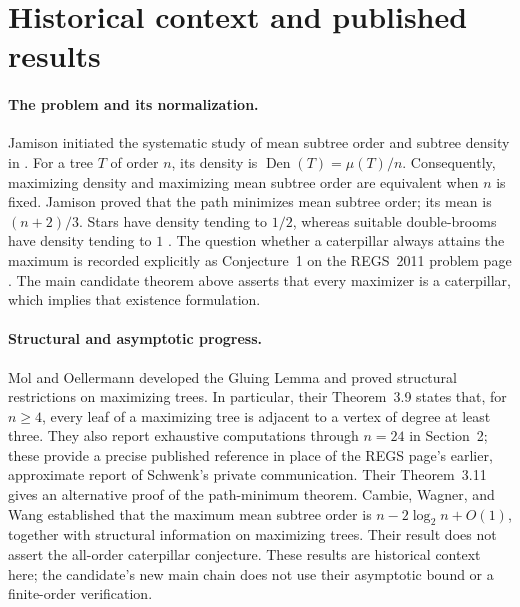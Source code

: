 \documentclass[11pt,letterpaper]{article}
\theoremstyle{plain}
\begin{document}
\clearpage
\tableofcontents
\clearpage

\section*{Historical context and published results}
\label{sec:historical-context}

\paragraph{The problem and its normalization.}
Jamison initiated the systematic study of mean subtree order and subtree density in
\cite{Jamison1983,Jamison1984}. For a tree $T$ of order $n$, its density is
$\operatorname{Den}(T)=\mu(T)/n$. Consequently, maximizing density and maximizing
mean subtree order are equivalent when $n$ is fixed. Jamison proved that the path
minimizes mean subtree order; its mean is $(n+2)/3$. Stars have density tending
to $1/2$, whereas suitable double-brooms have density tending to $1$
\cite{Jamison1983}. The question whether a caterpillar always attains the
maximum is recorded explicitly as Conjecture~1 on the REGS~2011 problem page
\cite{JamisonREGS2011}. The main candidate theorem above asserts that every
maximizer is a caterpillar, which implies that existence formulation.

\paragraph{Structural and asymptotic progress.}
Mol and Oellermann \cite{MolOellermann2019} developed the Gluing Lemma and proved
structural restrictions on maximizing trees. In particular, their Theorem~3.9
states that, for $n\ge4$, every leaf of a maximizing tree is adjacent to a vertex
of degree at least three. They also report exhaustive computations through
$n=24$ in Section~2; these provide a precise published reference in place of the
REGS page's earlier, approximate report of Schwenk's private communication.
Their Theorem~3.11 gives an alternative proof of the path-minimum theorem.
Cambie, Wagner, and Wang \cite{CambieWagnerWang2021} established that the maximum
mean subtree order is $n-2\log_2 n+O(1)$, together with structural information
on maximizing trees. Their result does not assert the all-order caterpillar
conjecture. These results are historical context here; the candidate's new
main chain does not use their asymptotic bound or a finite-order verification.
\end{document}
